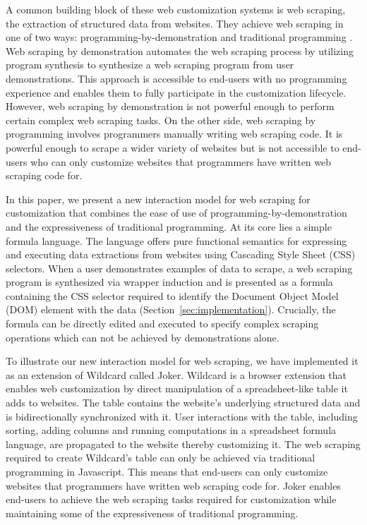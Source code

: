 \documentclass[sigconf,10pt]{acmart}
\begin{document}
A common building block of these web customization systems is web
scraping, the extraction of structured data from websites. They achieve
web scraping in one of two ways: programming-by-demonstration
\citep{huynh2006, lin2009} and traditional programming
\citep{litt2020, litt2020b}. Web scraping by demonstration automates the
web scraping process by utilizing program synthesis to synthesize a web
scraping program from user demonstrations. This approach is accessible
to end-users with no programming experience and enables them to fully
participate in the customization lifecycle. However, web scraping by
demonstration is not powerful enough to perform certain complex web
scraping tasks. On the other side, web scraping by programming involves
programmers manually writing web scraping code. It is powerful enough to
scrape a wider variety of websites but is not accessible to end-users
who can only customize websites that programmers have written web
scraping code for.

In this paper, we present a new interaction model for web scraping for
customization that combines the ease of use of
programming-by-demonstration and the expressiveness of traditional
programming. At its core lies a simple formula language. The language
offers pure functional semantics for expressing and executing data
extractions from websites using Cascading Style Sheet (CSS) selectors.
When a user demonstrates examples of data to scrape, a web scraping
program is synthesized via wrapper induction \citep{kushmerick2000} and
is presented as a formula containing the CSS selector required to
identify the Document Object Model (DOM) element with the data
(Section~\ref{sec:implementation}). Crucially, the formula can be
directly edited and executed to specify complex scraping operations
which can not be achieved by demonstrations alone.

To illustrate our new interaction model for web scraping, we have
implemented it as an extension of Wildcard \citep{litt2020, litt2020b}
called Joker. Wildcard is a browser extension that enables web
customization by direct manipulation of a spreadsheet-like table it adds
to websites. The table contains the website's underlying structured data
and is bidirectionally synchronized with it. User interactions with the
table, including sorting, adding columns and running computations in a
spreadsheet formula language, are propagated to the website thereby
customizing it. The web scraping required to create Wildcard's table can
only be achieved via traditional programming in Javascript. This means
that end-users can only customize websites that programmers have written
web scraping code for. Joker enables end-users to achieve the web
scraping tasks required for customization while maintaining some of the
expressiveness of traditional programming.
\end{document}
